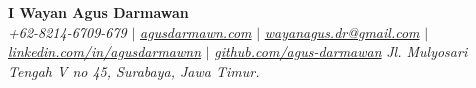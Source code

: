 \begin{flushleft}
    \textbf{\large I Wayan Agus Darmawan} \\    
    \textit{+62-8214-6709-679} $|$  
    \href{https://agusdarmawn.com/}{{\textit{agusdarmawn.com}}} $|$
    \href{mailto:wayanagus.dr@gmail.com}{{\textit{wayanagus.dr@gmail.com}}} $|$ 
    \href{www.linkedin.com/in/agusdarmawnn}{{\textit{linkedin.com/in/agusdarmawnn}}} $|$
    \href{https://github.com/agus-darmawan}{{\textit{github.com/agus-darmawan}}}
    \textit{Jl. Mulyosari Tengah V no 45, Surabaya, Jawa Timur.}  
    \vspace{-6pt}
\end{flushleft}
